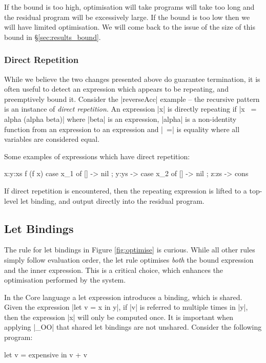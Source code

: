 \documentclass{llncs}
\begin{document}
If the bound is too high, optimisation will take programs will take too long and the residual program will be excessively large. If the bound is too low then we will have limited optimisation. We will come back to the issue of the size of this bound in \S\ref{sec:results_bound}.

\subsubsection{Direct Repetition}
\label{sec:direct}

While we believe the two changes presented above do guarantee termination, it is often useful to detect an expression which appears to be repeating, and preemptively bound it. Consider the |reverseAcc| example -- the recursive pattern is an instance of \textit{direct repetition}. An expression |x| is directly repeating if |x ~= alpha (alpha beta)| where |beta| is an expression, |alpha| is a non-identity function from an expression to an expression and |~=| is equality where all variables are considered equal.

Some examples of expressions which have direct repetition:

\begin{code}
x:y:xs
f (f x)
case x_1 of {[] -> nil ; y:ys -> case x_2 of {[] -> nil ; z:zs -> cons}}
\end{code}

If direct repetition is encountered, then the repeating expression is lifted to a top-level let binding, and output directly into the residual program.

\subsection{Let Bindings}
\label{sec:let}

The rule for let bindings in Figure \ref{fig:optimise} is curious. While all other rules simply follow evaluation order, the let rule optimises \textit{both} the bound expression and the inner expression. This is a critical choice, which enhances the optimisation performed by the system.

In the Core language a let expression introduces a binding, which is shared. Given the expression |let v = x in y|, if |v| is referred to multiple times in |y|, then the expression |x| will only be computed once. It is important when applying |_OO| that shared let bindings are not unshared. Consider the following program:

\begin{code}
let v = expensive
in v + v
\end{code}
\end{document}
